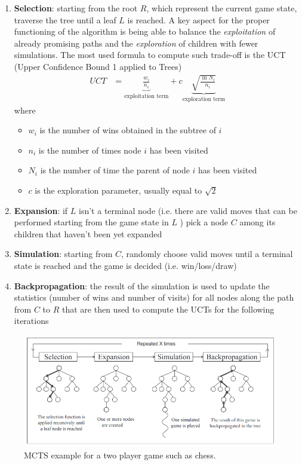 \begin{enumerate}
    \item \textbf{Selection}: starting from the root $R$, which represent the current game state, traverse the tree until a leaf $L$ is reached. A key aspect for the proper functioning of the algorithm is being able to balance the \textit{exploitation} of already promising paths and the \textit{exploration} of children with fewer simulations. The most used formula to compute such trade-off is the UCT (Upper Confidence Bound 1 applied to Trees)
          \begin{align*}
              UCT & = \underbrace{\frac {w_{i}}{n_{i}}}_{\text{exploitation term}}+c\underbrace{{\sqrt {\frac {\ln N_{i}}{n_{i}}}}}_{\text{exploration term}}
          \end{align*}
          where
          \begin{itemize}
              \item $w_i$ is the number of wins obtained in the subtree of $i$
              \item $n_i$ is the number of times node $i$ has been visited
              \item $N_i$ is the number of time the parent of node $i$ has been visited
              \item $c$ is the exploration parameter, usually equal to $\sqrt{2}$
          \end{itemize}

    \item \textbf{Expansion}: if $L$ isn't a terminal node (i.e. there are valid moves that can be performed starting from the game state in $L$ ) pick a node $C$ among its children that haven't been yet expanded

    \item \textbf{Simulation}: starting from $C$, randomly choose valid moves until a terminal state is reached and the game is decided (i.e. win/loss/draw)

    \item \textbf{Backpropagation}: the result of the simulation is used to update the statistics (number of wins and number of visits) for all nodes along the path from $C$ to $R$ that are then used to compute the UCTs for the following iterations
\end{enumerate}

\begin{figure}
    \centering
    \includegraphics[width=\linewidth]{figures/mcts.png}
    \caption{MCTS example for a two player game such as chess.}
    \label{fig:mcts}
\end{figure}

